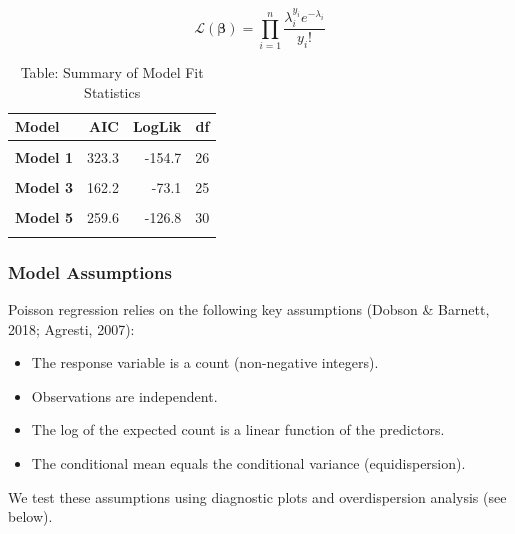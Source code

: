 \documentclass[
  12pt,
]{article}
\providecommand{\tightlist}{%
  \setlength{\itemsep}{0pt}\setlength{\parskip}{0pt}}
\begin{document}
\[
\mathcal{L}(\boldsymbol{\beta}) = \prod_{i=1}^n \frac{\lambda_i^{y_i} e^{-\lambda_i}}{y_i!}
\]

\begin{table}[!h]
\centering
\caption{\label{tab:model-summary-table_2}Table: Summary of Model Fit Statistics}
\centering
\begin{tabular}[t]{>{}lrrr}
\toprule
Model & AIC & LogLik & df\\
\midrule
\textbf{\cellcolor{gray!10}{Model 0}} & \cellcolor{gray!10}{442.7} & \cellcolor{gray!10}{-216.3} & \cellcolor{gray!10}{28}\\
\textbf{Model 1} & 323.3 & -154.7 & 26\\
\textbf{\cellcolor{gray!10}{Model 2}} & \cellcolor{gray!10}{212.7} & \cellcolor{gray!10}{-99.3} & \cellcolor{gray!10}{26}\\
\textbf{Model 3} & 162.2 & -73.1 & 25\\
\textbf{\cellcolor{gray!10}{Model 4}} & \cellcolor{gray!10}{162.8} & \cellcolor{gray!10}{-74.4} & \cellcolor{gray!10}{26}\\
\addlinespace
\textbf{Model 5} & 259.6 & -126.8 & 30\\
\textbf{\cellcolor{gray!10}{ZIP Model}} & \cellcolor{gray!10}{214.7} & \cellcolor{gray!10}{-99.3} & \cellcolor{gray!10}{NA}\\
\bottomrule
\end{tabular}
\end{table}

\subsubsection{Model Assumptions}\label{model-assumptions}

Poisson regression relies on the following key assumptions (Dobson \&
Barnett, 2018; Agresti, 2007):

\begin{itemize}
\tightlist
\item
  The response variable is a count (non-negative integers).
\item
  Observations are independent.
\item
  The log of the expected count is a linear function of the predictors.
\item
  The conditional mean equals the conditional variance (equidispersion).
\end{itemize}

We test these assumptions using diagnostic plots and overdispersion
analysis (see below).
\end{document}
